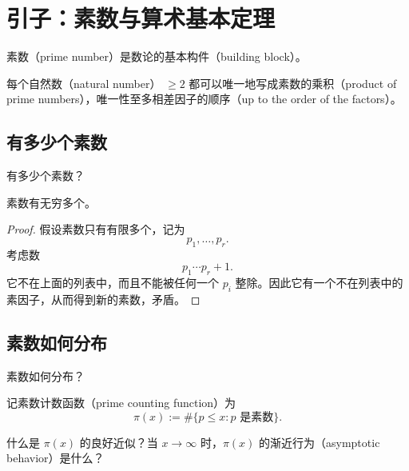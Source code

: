 \setcounter{chapter}{-1}
\chapter{引子：素数与算术基本定理}
\label{chap:week-one-primes}


素数（prime number）是数论的基本构件（building block）。

\begin{theorem}
	每个自然数（natural number）
$\geq 2$
	都可以唯一地写成素数的乘积（product of prime numbers），唯一性至多相差因子的顺序（up to the order of the factors）。
\end{theorem}

\section{有多少个素数}

\begin{question}
	有多少个素数？
\end{question}

\begin{theorem}[Euclid]
	素数有无穷多个。
\end{theorem}

\begin{proof}
	假设素数只有有限多个，记为
	\[
		p_1,\ldots,p_r.
	\]
	考虑数
	\[
		p_1\cdots p_r+1.
	\]
	它不在上面的列表中，而且不能被任何一个 $p_i$ 整除。因此它有一个不在列表中的素因子，从而得到新的素数，矛盾。
	
\end{proof}


\section{素数如何分布}

\begin{question}
	素数如何分布？
\end{question}

记素数计数函数（prime counting function）为
\[
	\pi(x):=\#\{p\leq x: p\text{ 是素数}\}.
\]

\begin{question}
	什么是 $\pi(x)$ 的良好近似？当 $x\to \infty$ 时，$\pi(x)$ 的渐近行为（asymptotic behavior）是什么？
\end{question}

